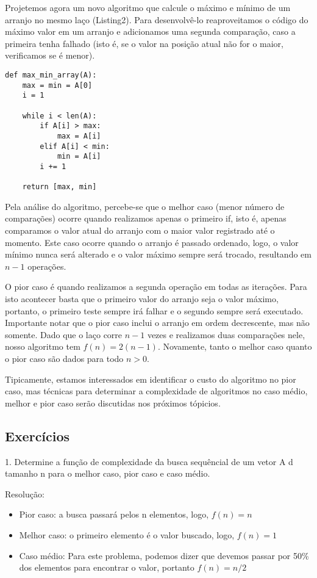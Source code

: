\documentclass[ a4paper, twocolumn]{article}
\begin{document}
Projetemos agora um novo algoritmo que calcule o máximo e mínimo de um arranjo no mesmo laço (Listing2). Para desenvolvê-lo reaproveitamos o código do máximo valor em um arranjo e adicionamos uma segunda comparação, caso a primeira tenha falhado (isto é, se o valor na posição atual não for o maior, verificamos se é menor). 

\begin{lstlisting}[label=max_min_array,caption= Maior e menor valor de um arranjo]
def max_min_array(A):
    max = min = A[0]
    i = 1
    
    while i < len(A):
        if A[i] > max:
            max = A[i]
        elif A[i] < min:
            min = A[i]
        i += 1

    return [max, min]
\end{lstlisting}

Pela análise do algoritmo, percebe-se que o melhor caso (menor número de comparações) ocorre quando realizamos apenas o primeiro if, isto é, apenas comparamos o valor atual do arranjo com o maior valor registrado até o momento. Este caso ocorre quando o arranjo é passado ordenado, logo, o valor mínimo nunca será alterado e o valor máximo sempre será trocado, resultando em $n-1$ operações. 

O pior caso é quando realizamos a segunda operação em todas as iterações. Para isto acontecer basta que o primeiro valor do arranjo seja o valor máximo, portanto, o primeiro teste sempre irá falhar e o segundo sempre será executado.   Importante notar que o pior caso inclui o arranjo em ordem decrescente, mas não somente. Dado que o laço corre $n-1$ vezes e realizamos duas comparações nele, nosso algoritmo tem $f(n) = 2(n-1)$. Novamente, tanto o melhor caso quanto o pior caso são dados para todo $n>0$.

Tipicamente, estamos interessados em identificar o custo do algoritmo no pior caso, mas técnicas para determinar a complexidade de algoritmos no caso médio, melhor e pior caso serão discutidas nos próximos tópicios.

\subsection{Exercícios}
1. Determine a função de complexidade da busca sequêncial de um vetor A d tamanho n para o melhor caso, pior caso e caso médio.

Resolução: 

\begin{itemize}
\item Pior caso: a busca passará pelos n elementos, logo, $f(n) = n$
\item Melhor caso: o primeiro elemento é o valor buscado, logo, $f(n) =  1$
\item Caso médio: Para este problema, podemos dizer que devemos passar por 50\% dos elementos para encontrar o valor, portanto $f(n) = n/2$
\end{itemize}
\end{document}
